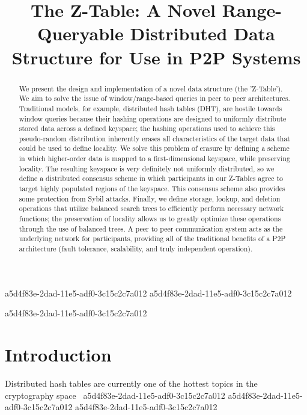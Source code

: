 \documentclass[12pt]{article}
\title{The Z-Table: A Novel Range-Queryable Distributed Data Structure for Use in P2P Systems}
\begin{document}
\maketitle
a5d4f83e-2dad-11e5-adf0-3c15c2c7a012
a5d4f83e-2dad-11e5-adf0-3c15c2c7a012\begin{abstract}
We present the design and implementation of a novel data structure (the 'Z-Table'). We aim to solve the issue of window/range-based queries in peer to peer architectures. Traditional models, for example,  distributed hash tables (DHT), are hostile towards window queries because their hashing operations are designed to uniformly distribute stored data across a defined keyspace; the hashing operations used to achieve this pseudo-random distribution inherently erases all characteristics of the target data that could be used to define locality. We solve this problem of erasure by defining a scheme in which higher-order data is mapped to a first-dimensional keyspace, while preserving locality. The resulting keyspace is very definitely not uniformly distributed, so we define a distributed consensus scheme in which participants in our Z-Tables agree to target highly populated regions of the keyspace. This consensus scheme also provides some protection from Sybil attacks. Finally, we define storage, lookup, and deletion operations that utilize balanced search trees to efficiently perform necessary network functions; the preservation of locality allows us to greatly optimize these operations through the use of balanced trees. A peer to peer communication system acts as the underlying network for participants, providing all of the traditional benefits of a P2P architecture (fault tolerance, scalability, and truly independent operation).
\end{abstract}
a5d4f83e-2dad-11e5-adf0-3c15c2c7a012

\newpage
\section{Introduction}
Distributed hash tables are currently one of the hottest topics in the cryptography space~\cite{Stoica:2001dj,Rowstron:2001ea,Ratnasamy:2001wn}
a5d4f83e-2dad-11e5-adf0-3c15c2c7a012
a5d4f83e-2dad-11e5-adf0-3c15c2c7a012\printbibliography
a5d4f83e-2dad-11e5-adf0-3c15c2c7a012
\end{document}
